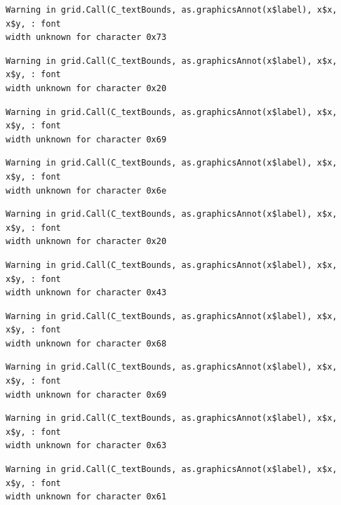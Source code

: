 \documentclass[
  letterpaper,
]{scrbook}
\begin{document}
\begin{verbatim}
Warning in grid.Call(C_textBounds, as.graphicsAnnot(x$label), x$x, x$y, : font
width unknown for character 0x73
\end{verbatim}

\begin{verbatim}
Warning in grid.Call(C_textBounds, as.graphicsAnnot(x$label), x$x, x$y, : font
width unknown for character 0x20
\end{verbatim}

\begin{verbatim}
Warning in grid.Call(C_textBounds, as.graphicsAnnot(x$label), x$x, x$y, : font
width unknown for character 0x69
\end{verbatim}

\begin{verbatim}
Warning in grid.Call(C_textBounds, as.graphicsAnnot(x$label), x$x, x$y, : font
width unknown for character 0x6e
\end{verbatim}

\begin{verbatim}
Warning in grid.Call(C_textBounds, as.graphicsAnnot(x$label), x$x, x$y, : font
width unknown for character 0x20
\end{verbatim}

\begin{verbatim}
Warning in grid.Call(C_textBounds, as.graphicsAnnot(x$label), x$x, x$y, : font
width unknown for character 0x43
\end{verbatim}

\begin{verbatim}
Warning in grid.Call(C_textBounds, as.graphicsAnnot(x$label), x$x, x$y, : font
width unknown for character 0x68
\end{verbatim}

\begin{verbatim}
Warning in grid.Call(C_textBounds, as.graphicsAnnot(x$label), x$x, x$y, : font
width unknown for character 0x69
\end{verbatim}

\begin{verbatim}
Warning in grid.Call(C_textBounds, as.graphicsAnnot(x$label), x$x, x$y, : font
width unknown for character 0x63
\end{verbatim}

\begin{verbatim}
Warning in grid.Call(C_textBounds, as.graphicsAnnot(x$label), x$x, x$y, : font
width unknown for character 0x61
\end{verbatim}
\end{document}
